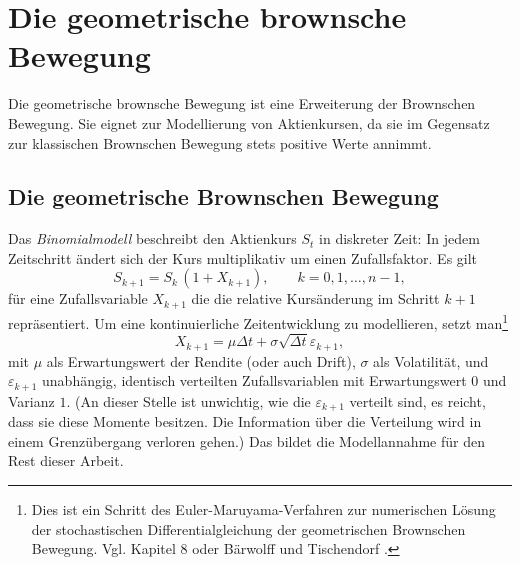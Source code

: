 \section{Die geometrische brownsche Bewegung}

Die geometrische brownsche Bewegung ist eine Erweiterung der Brownschen Bewegung. 
Sie eignet zur Modellierung von Aktienkursen, da sie im Gegensatz zur klassischen 
Brownschen Bewegung stets positive Werte annimmt.


\subsection{Die geometrische Brownschen Bewegung}

Das \textit{Binomialmodell} beschreibt den Aktienkurs $S_t$ in diskreter Zeit: In jedem Zeitschritt ändert sich der Kurs multiplikativ um einen Zufallsfaktor. Es gilt
$$
S_{k+1} = S_k \,(1 + X_{k+1}), \qquad k = 0,1,\dots,n-1,
$$
für eine Zufallsvariable $X_{k+1}$ die die relative Kursänderung im Schritt $k+1$ repräsentiert. Um eine kontinuierliche Zeitentwicklung zu modellieren, 
setzt man\footnote{Dies ist ein Schritt des Euler-Maruyama-Verfahren zur numerischen Lösung der 
stochastischen Differentialgleichung der geometrischen Brownschen Bewegung. Vgl. Kapitel 8 oder Bärwolff und Tischendorf \cite{Baerwolff2025}.}
$$
X_{k+1} = \mu  \Delta t + \sigma \sqrt{\Delta t}\varepsilon_{k+1},
$$
mit $\mu$ als Erwartungswert der Rendite (oder auch Drift), $\sigma$ als Volatilität, und $\varepsilon_{k+1}$ unabhängig, identisch verteilten Zufallsvariablen mit Erwartungswert $0$ und Varianz $1$. 
(An dieser Stelle ist unwichtig, wie die $\varepsilon_{k+1}$ verteilt sind, es reicht, dass sie diese Momente besitzen. 
Die Information über die Verteilung wird in einem Grenzübergang verloren gehen.)
Das bildet die Modellannahme für den Rest dieser Arbeit.

